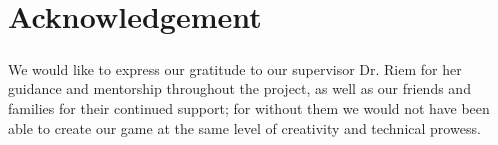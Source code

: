 \chapter*{Acknowledgement}
\paragraph*{}
We would like to express our gratitude to our supervisor Dr. Riem for her guidance and mentorship 
throughout the project, as well as our friends and families for their continued support; for without them we 
would not have been able to create our game at the same level of creativity and technical prowess.